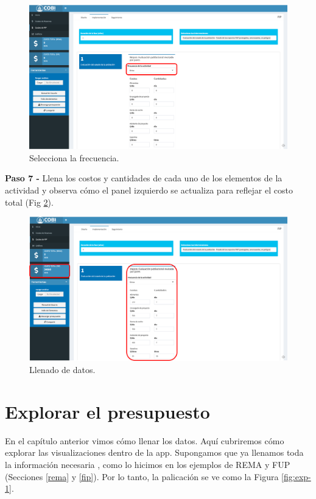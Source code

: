 \documentclass[
]{book}
\begin{document}
\begin{figure}
\includegraphics[width=61.11in]{images/fip-imp-6} \caption{Selecciona la frecuencia.}\label{fig:fip-imp-6}
\end{figure}

\textbf{Paso 7 - } Llena los costos y cantidades de cada uno de los elementos de la actividad y observa cómo el panel izquierdo se actualiza para reflejar el costo total (Fig \ref{fig:fip-imp-7}).

\begin{figure}
\includegraphics[width=61.24in]{images/fip-imp-7} \caption{Llenado de datos.}\label{fig:fip-imp-7}
\end{figure}

\hypertarget{explorar}{%
\chapter{Explorar el presupuesto}\label{explorar}}

En el capítulo anterior vimos cómo llenar los datos. Aquí cubriremos cómo explorar las visualizaciones dentro de la app. Supongamos que ya llenamos toda la información necesaria , como lo hicimos en los ejemplos de REMA y FUP (Secciones \ref{rema} y \ref{fip}). Por lo tanto, la palicación se ve como la Figura \ref{fig:exp-1}.
\end{document}
